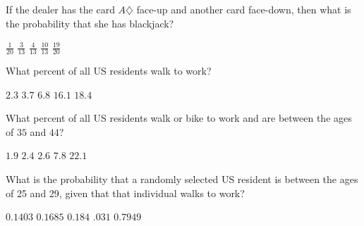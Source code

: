 \documentclass[answers,12pt]{exam}
\begin{document}
\begin{questions}
\question\label{LastBJ}
If the dealer has the card $A\diamondsuit$
face-up and another card face-down, then what is the probability
that she has blackjack?\\
\begin{oneparchoices}
\choice $\frac{1}{20}$ %
\choice $\frac{3}{13}$ %
\correctchoice $\frac{4}{13}$
\choice $\frac{10}{13}$
\choice $\frac{19}{20}$ %
\end{oneparchoices}


\question\label{FirstWalk}
What percent of all US residents walk to work?\\
\begin{oneparchoices}
\choice $2.3$ %
\choice $3.7$ %
\choice $6.8$ %
\choice $16.1$ %
\correctchoice $18.4$
\end{oneparchoices}

\question
What percent of all US residents walk or bike to work
and are between the ages of $35$ and $44$?\\
\begin{oneparchoices}
\choice $1.9$ %
\correctchoice $2.4$
\choice $2.6$ %
\choice $7.8$ %
\choice $22.1$ %
\end{oneparchoices}

\question
What is the probability that a randomly selected US resident
is between the ages of 25 and 29, given that that individual
walks to work?\\
\begin{oneparchoices}
\choice $0.1403$ %
\correctchoice $0.1685$
\choice $0.184$ %
\choice $.031$ %
\choice $0.7949$ %
\end{oneparchoices}


\end{questions}
\end{document}
